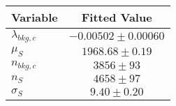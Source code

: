 \begin{tabular}[t]{lc}
\hline
Variable &Fitted Value\\
\hline\hline
$\lambda_{bkg,c}$&$-0.00502\pm0.00060$\\
\hline
$\mu_{S}$&$1968.68\pm0.19$\\
\hline
$n_{bkg,c}$&$3856\pm93$\\
\hline
$n_{S}$&$4658\pm97$\\
\hline
$\sigma_{S}$&$9.40\pm0.20$\\
\hline
\end{tabular}